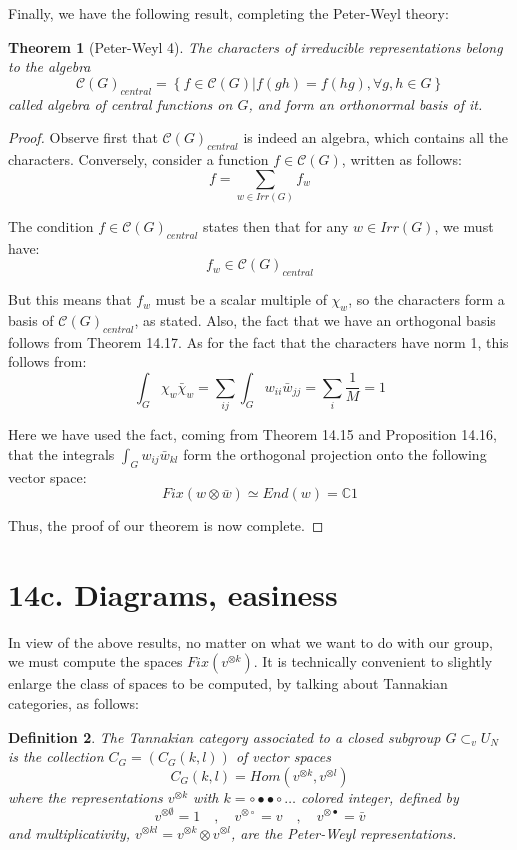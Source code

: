 \documentclass[12pt]{amsbook}
\newtheorem{theorem}{Theorem}[chapter]
\newtheorem{definition}[theorem]{Definition}
\begin{document}
Finally, we have the following result, completing the Peter-Weyl theory:


\begin{theorem}[Peter-Weyl 4]
The characters of irreducible representations belong to the algebra
$$\mathcal C(G)_{central}=\left\{f\in\mathcal C(G)\Big|f(gh)=f(hg),\forall g,h\in G\right\}$$
called algebra of central functions on $G$, and form an orthonormal basis of it.
\end{theorem}

\begin{proof}
Observe first that $\mathcal C(G)_{central}$ is indeed an algebra, which contains all the characters. Conversely, consider a function $f\in\mathcal C(G)$, written as follows:
$$f=\sum_{w\in Irr(G)}f_w$$

The condition $f\in\mathcal C(G)_{central}$ states then that for any $w\in Irr(G)$, we must have:
$$f_w\in\mathcal C(G)_{central}$$

But this means that $f_w$ must be a scalar multiple of $\chi_w$, so the characters form a basis of $\mathcal C(G)_{central}$, as stated. Also, the fact that we have an orthogonal basis follows from Theorem 14.17. As for the fact that the characters have norm 1, this follows from:
$$\int_G\chi_w\bar{\chi}_w
=\sum_{ij}\int_Gw_{ii}\bar{w}_{jj}
=\sum_i\frac{1}{M}
=1$$

Here we have used the fact, coming from Theorem 14.15 and Proposition 14.16, that the integrals $\int_Gw_{ij}\bar{w}_{kl}$ form the orthogonal projection onto the following vector space:
$$Fix(w\otimes\bar{w})\simeq End(w)=\mathbb C1$$

Thus, the proof of our theorem is now complete.
\end{proof}

\section*{14c. Diagrams, easiness}

In view of the above results, no matter on what we want to do with our group, we must compute the spaces $Fix(v^{\otimes k})$. It is technically convenient to slightly enlarge the class of spaces to be computed, by talking about Tannakian categories, as follows:


\begin{definition}
The Tannakian category associated to a closed subgroup $G\subset_vU_N$ is the collection $C_G=(C_G(k,l))$ of vector spaces
$$C_G(k,l)=Hom(v^{\otimes k},v^{\otimes l})$$
where the representations $v^{\otimes k}$ with $k=\circ\bullet\bullet\circ\ldots$ colored integer, defined by
$$v^{\otimes\emptyset}=1\quad,\quad
v^{\otimes\circ}=v\quad,\quad
v^{\otimes\bullet}=\bar{v}$$
and multiplicativity, $v^{\otimes kl}=v^{\otimes k}\otimes v^{\otimes l}$, are the Peter-Weyl representations.
\end{definition}
\end{document}
